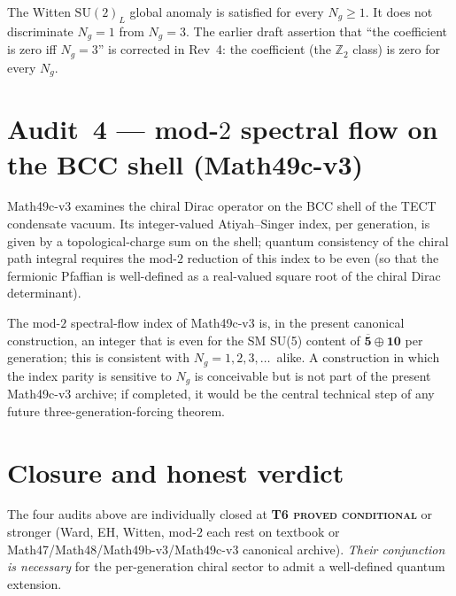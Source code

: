 \begin{remark}[Witten does not discriminate $N_g = 3$]
\label{rmk:witten-noselect}
The Witten $\mathrm{SU}(2)_L$ global anomaly is satisfied for every
$N_g\geq 1$. It does not discriminate $N_g = 1$ from $N_g = 3$. The
earlier draft assertion that ``the coefficient is zero iff
$N_g = 3$'' is corrected in Rev~4: the coefficient (the
$\mathbb{Z}_2$ class) is zero for every $N_g$.
\end{remark}

\section{Audit~4 --- mod-$2$ spectral flow on the BCC shell
(Math49c-v3)}\label{sec:mod2}
Math49c-v3 examines the chiral Dirac operator on the BCC shell of the
TECT condensate vacuum. Its integer-valued Atiyah--Singer index, per
generation, is given by a topological-charge sum on the shell;
quantum consistency of the chiral path integral requires the
mod-$2$ reduction of this index to be even (so that the fermionic
Pfaffian is well-defined as a real-valued square root of the chiral
Dirac determinant).

\begin{remark}[Mod-$2$ does not, in the present construction, force
$N_g = 3$]\label{rmk:mod2-noselect}
The mod-$2$ spectral-flow index of Math49c-v3 is, in the present
canonical construction, an integer that is even for the SM SU(5)
content of $\overline{\mathbf{5}}\oplus \mathbf{10}$ per generation;
this is consistent with $N_g = 1, 2, 3, \dots$\ alike. A construction
in which the index parity is sensitive to $N_g$ is conceivable but is
not part of the present Math49c-v3 archive; if completed, it would
be the central technical step of any future
three-generation-forcing theorem.
\end{remark}

\section{Closure and honest verdict}\label{sec:closure}
The four audits above are individually closed at \textbf{T6
\textsc{proved conditional}} or stronger (Ward, EH, Witten, mod-$2$
each rest on textbook or Math47/Math48/Math49b-v3/Math49c-v3
canonical archive). \emph{Their conjunction is necessary} for the
per-generation chiral sector to admit a well-defined quantum
extension.

